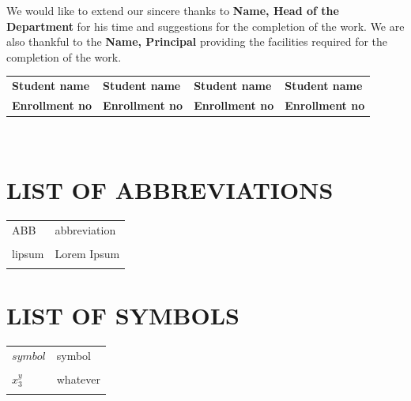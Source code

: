 \documentclass[12pt, oneside]{book}                            %
\begin{document}
    We would like to extend our sincere thanks to \textbf{Name, Head of the Department} for his time and suggestions for the completion of the work. We are also thankful to the \textbf{Name, Principal} providing the facilities required for the completion of the work.\\[2cm]
    
    
    \noindent
    \begin{tabularx}{\textwidth}{X X X X}     
        \textbf{\small Student name} & \textbf{\small Student name} & \textbf{\small Student name} & \textbf{\small Student name} \\
        \textbf{\small Enrollment no} & \textbf{\small Enrollment no} & \textbf{\small Enrollment no} & \textbf{\small Enrollment no}
    \end{tabularx}\\[1cm]



\clearpage
\newpage
\tableofcontents
{}
\clearpage
\listoffigures
{}
\clearpage
\listoftables
{}
\clearpage

\chapter*{\centering \textbf{\Large LIST OF ABBREVIATIONS}}
    \begin{tabularx}{\textwidth}{X X}
            ABB & abbreviation\\\\
            lipsum &  Lorem Ipsum\\\\
    \end{tabularx}
    

\chapter*{\centering \textbf{\Large LIST OF SYMBOLS}}
    \begin{tabularx}{\textwidth}{X X}
            $symbol$ & symbol\\\\
            $x^y_3$ &  whatever\\\\
    \end{tabularx}
    
\end{document}
